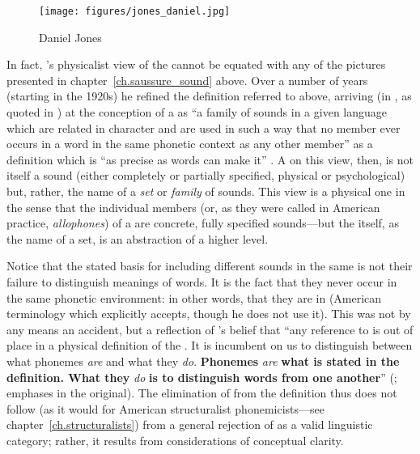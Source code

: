 \begin{wrapfigure}{r}{.35\textwidth}
  \texttt{[image: figures/jones\_daniel.jpg]}
  \caption{Daniel Jones}
  \label{fig:ch.firth.jones2}
\end{wrapfigure}
In fact, {\Jones}'s physicalist view of the  cannot be equated
with any of the pictures presented in chapter~\ref{ch.saussure_sound}
above. Over a number of years (starting in the 1920s) he
refined the definition referred to above, arriving (in
\citealt{jones50:phoneme}, as quoted in
\citealt[14]{jones57:meaning.of.phoneme}) at the conception of a
 as ``a family of sounds in a given language which are related
in character and are used in such a way that no member ever occurs in
a word in the same phonetic context as any other member'' as a
definition which is ``as precise as words can make it''
\citep[14]{jones57:meaning.of.phoneme}. A  on this view, then,
is not itself a sound (either completely or partially specified,
physical or psychological) but, rather, the name of a \emph{set} or
\emph{family} of sounds. This view is a physical one in the sense that
the individual members (or, as they were called in American practice,
\emph{allophones}) of a  are concrete, fully specified
sounds—but the  itself, as the name of a set, is an abstraction
of a higher level.

Notice that the stated basis for including different sounds in the same
 is not their failure to distinguish meanings of words. It is
the fact that they never occur in the same phonetic environment: in
other words, that they are in  (American
terminology which {\Jones} explicitly accepts, though he does not use
it). This was not by any means an accident, but a reflection of
{\Jones}'s belief that ``any reference to  is out of place in a
physical definition of the . It is incumbent on us to
distinguish between what phonemes \emph{are} and what they
\emph{do}. \textbf{Phonemes} \emph{are} \textbf{what is stated in the
  definition. What they} \emph{do} \textbf{is to distinguish words
  from one another}'' (\citealt[15]{jones57:meaning.of.phoneme};
emphases in the original). The elimination of  from the
definition thus does not follow (as it would for American
structuralist phonemicists—see chapter~\ref{ch.structuralists}) from a
general rejection of  as a valid linguistic category; rather,
it results from considerations of conceptual clarity.

